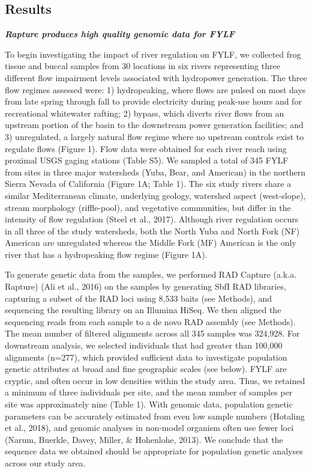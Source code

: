 \documentclass[twoside,12pt,final]{ucthesis-CA2012} %
\begin{document}
\begin{ucmainmatter}
\clearpage

\hypertarget{results}{%
\section{Results}\label{results}}

\textbf{\emph{Rapture produces high quality genomic data for FYLF}}

To begin investigating the impact of river regulation on FYLF, we
collected frog tissue and buccal samples from 30 locations in six rivers
representing three different flow impairment levels associated with
hydropower generation. The three flow regimes assessed were: 1)
hydropeaking, where flows are pulsed on most days from late spring
through fall to provide electricity during peak-use hours and for
recreational whitewater rafting; 2) bypass, which diverts river flows
from an upstream portion of the basin to the downstream power generation
facilities; and 3) unregulated, a largely natural flow regime where no
upstream controls exist to regulate flows (Figure 1). Flow data were
obtained for each river reach using proximal USGS gaging stations (Table
S5). We sampled a total of 345 FYLF from sites in three major watersheds
(Yuba, Bear, and American) in the northern Sierra Nevada of California
(Figure 1A; Table 1). The six study rivers share a similar Mediterranean
climate, underlying geology, watershed aspect (west-slope), stream
morphology (riffle-pool), and vegetative communities, but differ in the
intensity of flow regulation (Steel et al., 2017). Although river
regulation occurs in all three of the study watersheds, both the North
Yuba and North Fork (NF) American are unregulated whereas the Middle
Fork (MF) American is the only river that has a hydropeaking flow regime
(Figure 1A).

To generate genetic data from the samples, we performed RAD Capture
(a.k.a. Rapture) (Ali et al., 2016) on the samples by generating SbfI
RAD libraries, capturing a subset of the RAD loci using 8,533 baits (see
Methods), and sequencing the resulting library on an Illumina HiSeq. We
then aligned the sequencing reads from each sample to a de novo RAD
assembly (see Methods). The mean number of filtered alignments across
all 345 samples was 324,928. For downstream analysis, we selected
individuals that had greater than 100,000 alignments (n=277), which
provided sufficient data to investigate population genetic attributes at
broad and fine geographic scales (see below). FYLF are cryptic, and
often occur in low densities within the study area. Thus, we retained a
minimum of three individuals per site, and the mean number of samples
per site was approximately nine (Table 1). With genomic data, population
genetic parameters can be accurately estimated from even low sample
numbers (Hotaling et al., 2018), and genomic analyses in non-model
organism often use fewer loci (Narum, Buerkle, Davey, Miller, \&
Hohenlohe, 2013). We conclude that the sequence data we obtained should
be appropriate for population genetic analyses across our study area.


\end{ucmainmatter}
\end{document}
